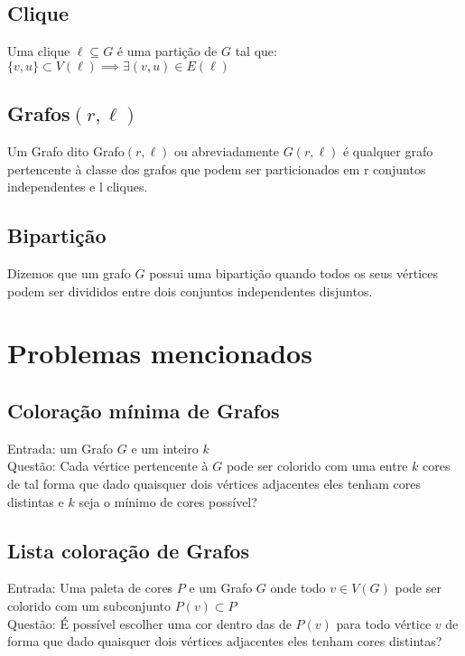 \subsection{Clique}
\begin{definition}
Uma clique $\ell \subseteq G$ é uma partição de $G$ tal que: $ \{v,u\} \subset V(\ell) \implies \exists (v,u) \in E(\ell)$
\end{definition}

\subsection{Grafos$(r,\ell)$}
\begin{definition}
	Um Grafo dito Grafo$(r,\ell)$ ou abreviadamente $G(r,\ell)$ é qualquer grafo pertencente à classe dos grafos que podem ser particionados em r conjuntos independentes e l cliques.
\end{definition}

\subsection{Bipartição}
\begin{definition}
 Dizemos que um grafo $G$ possui uma bipartição quando todos os seus vértices podem ser divididos entre dois conjuntos independentes disjuntos.
\end{definition}

\section{Problemas mencionados}

\subsection{Coloração mínima de Grafos}
\begin{definition}
	Entrada: um Grafo $G$ e um inteiro $k$\\
	Questão: Cada vértice pertencente à $G$ pode ser colorido com uma entre $k$ cores
	de tal forma que dado quaisquer dois vértices adjacentes eles tenham cores distintas e $k$ seja o mínimo de cores possível?
\end{definition}

\subsection{Lista coloração de Grafos}
\begin{definition}
  Entrada: Uma paleta de cores $P$ e um Grafo $G$ onde todo $v \in V(G)$ pode ser colorido com um subconjunto $P(v) \subset P$\\
  Questão: É possível escolher uma cor dentro das de $P(v)$ para todo vértice $v$ de forma que dado quaisquer dois vértices adjacentes eles tenham cores distintas?
\end{definition}

